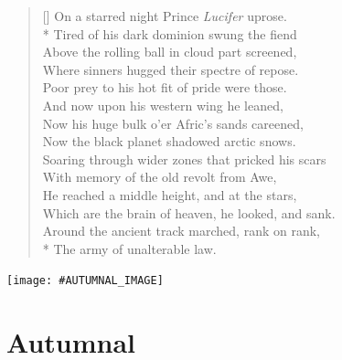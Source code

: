 \documentclass{amsbook}
\begin{document}
    \thispagestyle{empty}
    \vspace*{\fill}
    \settowidth{\versewidth}{\vin \vin Around the ancient track marched, rank on rank,}
    \begin{verse}[\versewidth]
        On a starred night Prince \textit{Lucifer} uprose.\\*
        \vin Tired of his dark dominion swung the fiend\\
        \vin Above the rolling ball in cloud part screened,\\
        Where sinners hugged their spectre of repose.\\
        Poor prey to his hot fit of pride were those.\\
        \vin And now upon his western wing he leaned,\\
        \vin Now his huge bulk o'er Afric's sands careened,\\
        Now the black planet shadowed arctic snows.\\
        Soaring through wider zones that pricked his scars\\
        \vin With memory of the old revolt from Awe,\\
        He reached a middle height, and at the stars,\\
        \vin \vin Which are the brain of heaven, he looked, and sank.\nobreak\\
        \vin \vin Around the ancient track marched, rank on rank,\\*
        \vin The army of unalterable law.
    \end{verse}
    \vspace*{\fill}
    \clearpage

    \thispagestyle{empty}
    \vspace*{\fill}
    {\centering
    \texttt{[image: \#AUTUMNAL\_IMAGE]}}
    \vspace*{\fill}
    \clearpage

    \mainmatter

    \chapter{Autumnal}

    \renewcommand{\poemone}{
        #AUTUMNAL_POEM_1
    }
    \renewcommand{\poemtwo}{
        #AUTUMNAL_POEM_2
    }
    \renewcommand{\poemthree}{
        #AUTUMNAL_PRAYER
    }
    \initprintpoems
\end{document}
